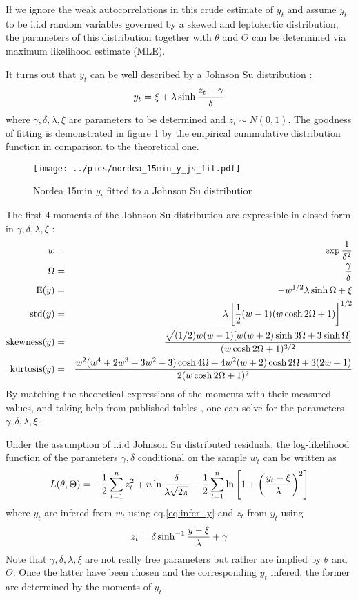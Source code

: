 \documentclass{book}
\begin{document}
If we ignore the weak autocorrelations in this crude estimate of
$y_t$ and assume $y_t$ to be i.i.d random variables governed
by a skewed and leptokertic distribution, the parameters of this
distribution together with $\theta$ and $\Theta$ can be determined via
maximum likelihood estimate (MLE).

It turns out that $y_t$ can be well described by a Johnson Su
distribution \cite{Shang2004}:
\[
  y_t = \xi + \lambda\sinh{z_t - \gamma \over \delta}
\]
where $\gamma, \delta, \lambda, \xi$ are parameters to be determined
and $z_t \sim N(0, 1)$. The goodness of fitting is demonstrated in
figure \ref{fig:nordea_15min_y_js_fit} by the
empirical cummulative distribution function in comparison to the
theoretical one.
\begin{figure}[htb!]
  \vspace{-18mm}
  \centering
    \texttt{[image: ../pics/nordea\_15min\_y\_js\_fit.pdf]}
    \caption{\footnotesize Nordea 15min $y_t$ fitted to a Johnson Su distribution}
    \label{fig:nordea_15min_y_js_fit}
\end{figure}

The first 4 moments of the Johnson Su distribution are expressible
in closed form in $\gamma, \delta, \lambda, \xi$ \cite{Shang2004}:
\begin{eqnarray*}
  w &=& \exp{1 \over \delta^2} \\
  \Omega &=& {\gamma \over \delta} \\
  \text{E}(y) &=& -w^{1/2} \lambda \sinh\Omega + \xi\\
  \text{std}(y) &=& \lambda \left[{1 \over 2}(w-1)(w\cosh 2\Omega +
    1)\right]^{1/2} \\
  \text{skewness}(y) &=& {
    \sqrt{(1/2)w(w-1)} [w(w+2)\sinh 3\Omega + 3\sinh\Omega]
    \over
    (w\cosh 2\Omega + 1)^{3/2}} \\
  \text{kurtosis}(y) &=& {
    w^2(w^4 + 2w^3 + 3w^2 - 3)\cosh 4\Omega + 4w^2 (w+2) \cosh 2\Omega
    + 3(2w+1) \over
    2(w\cosh 2\Omega + 1)^2 }
\end{eqnarray*}
By matching the theoretical expressions of the moments with their
measured values, and taking help from published tables
\cite{Johnson1965}, one can solve for the parameters $\gamma, \delta,
\lambda, \xi$.

Under the assumption of i.i.d Johnson Su distributed residuals, the
log-likelihood function of the parameters $\gamma, \delta$
conditional on the sample $w_t$ can be written as
\[
L(\theta, \Theta) = -{1 \over 2}\sum_{t=1}^n z_t^2 + n \ln{\delta
  \over \lambda \sqrt{2\pi}} - {1 \over 2}\sum_{t=1}^n \ln\left[
  1 + \left({y_t - \xi \over \lambda}\right)^2
\right]
\]
where $y_t$ are infered from $w_t$ using eq.\ref{eq:infer_y}
and $z_t$ from $y_t$ using
\[
z_t = \delta \sinh^{-1}{y - \xi \over \lambda} + \gamma
\]
Note that $\gamma, \delta, \lambda, \xi$ are not really free
parameters but rather are implied by $\theta$ and $\Theta$: Once the
latter have been chosen and the corresponding $y_t$ infered, the
former are determined by the moments of $y_t$.
\end{document}
